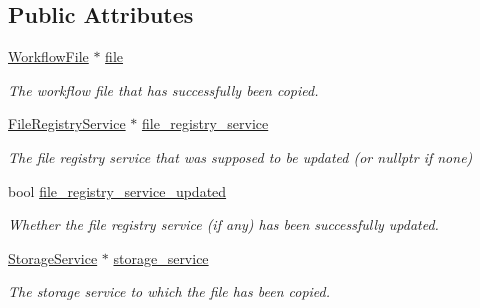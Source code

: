 \subsection*{Public Attributes}
\begin{DoxyCompactItemize}
\item 
\mbox{\label{classwrench_1_1_file_copy_completed_event_aed62752926d496a4335ec83dd5b8b028}} 
\hyperlink{classwrench_1_1_workflow_file}{Workflow\+File} $\ast$ \hyperlink{classwrench_1_1_file_copy_completed_event_aed62752926d496a4335ec83dd5b8b028}{file}
\begin{DoxyCompactList}\small\item\em The workflow file that has successfully been copied. \end{DoxyCompactList}\item 
\mbox{\label{classwrench_1_1_file_copy_completed_event_a5c2d148a0ed5b983d2107dd06e6beefe}} 
\hyperlink{classwrench_1_1_file_registry_service}{File\+Registry\+Service} $\ast$ \hyperlink{classwrench_1_1_file_copy_completed_event_a5c2d148a0ed5b983d2107dd06e6beefe}{file\+\_\+registry\+\_\+service}
\begin{DoxyCompactList}\small\item\em The file registry service that was supposed to be updated (or nullptr if none) \end{DoxyCompactList}\item 
\mbox{\label{classwrench_1_1_file_copy_completed_event_a6f72ffd664cfd233ae769b2985d85360}} 
bool \hyperlink{classwrench_1_1_file_copy_completed_event_a6f72ffd664cfd233ae769b2985d85360}{file\+\_\+registry\+\_\+service\+\_\+updated}
\begin{DoxyCompactList}\small\item\em Whether the file registry service (if any) has been successfully updated. \end{DoxyCompactList}\item 
\mbox{\label{classwrench_1_1_file_copy_completed_event_a58c97ffa789f6422b1e1798f104e80bf}} 
\hyperlink{classwrench_1_1_storage_service}{Storage\+Service} $\ast$ \hyperlink{classwrench_1_1_file_copy_completed_event_a58c97ffa789f6422b1e1798f104e80bf}{storage\+\_\+service}
\begin{DoxyCompactList}\small\item\em The storage service to which the file has been copied. \end{DoxyCompactList}\end{DoxyCompactItemize}

